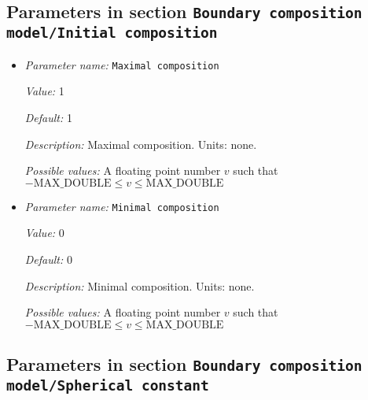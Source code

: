 \subsection{Parameters in section \tt Boundary composition model/Initial composition}
\label{parameters:Boundary_20composition_20model/Initial_20composition}

\begin{itemize}
\item {\it Parameter name:} {\tt Maximal composition}
\label{parameters:Boundary composition model/Initial composition/Maximal composition}
\label{parameters:Boundary_20composition_20model/Initial_20composition/Maximal_20composition}


{\it Value:} 1


{\it Default:} 1


{\it Description:} Maximal composition. Units: none.


{\it Possible values:} A floating point number $v$ such that $-\text{MAX\_DOUBLE} \leq v \leq \text{MAX\_DOUBLE}$
\item {\it Parameter name:} {\tt Minimal composition}
\label{parameters:Boundary composition model/Initial composition/Minimal composition}
\label{parameters:Boundary_20composition_20model/Initial_20composition/Minimal_20composition}


{\it Value:} 0


{\it Default:} 0


{\it Description:} Minimal composition. Units: none.


{\it Possible values:} A floating point number $v$ such that $-\text{MAX\_DOUBLE} \leq v \leq \text{MAX\_DOUBLE}$
\end{itemize}

\subsection{Parameters in section \tt Boundary composition model/Spherical constant}
\label{parameters:Boundary_20composition_20model/Spherical_20constant}

